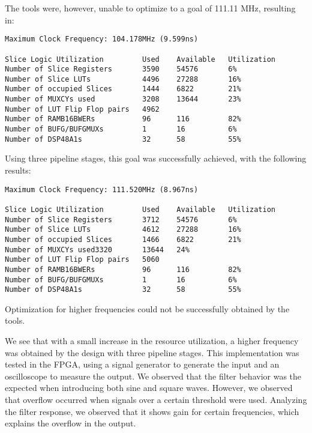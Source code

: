 \documentclass[12pt]{article}
\begin{document}
The tools were, however, unable to optimize to a goal of 111.11 MHz, resulting in:
 
\begin{verbatim}
Maximum Clock Frequency: 104.178MHz (9.599ns)

Slice Logic Utilization         Used    Available   Utilization
Number of Slice Registers       3590    54576       6% 
Number of Slice LUTs            4496    27288       16% 
Number of occupied Slices       1444    6822        21%
Number of MUXCYs used           3208    13644       23%
Number of LUT Flip Flop pairs   4962
Number of RAMB16BWERs           96      116         82%
Number of BUFG/BUFGMUXs         1       16          6% 
Number of DSP48A1s              32      58          55%
\end{verbatim}

Using three pipeline stages, this goal was successfully achieved, with the following results:

\begin{verbatim}
Maximum Clock Frequency: 111.520MHz (8.967ns)

Slice Logic Utilization         Used    Available   Utilization
Number of Slice Registers       3712    54576       6%
Number of Slice LUTs            4612    27288       16%
Number of occupied Slices       1466    6822        21%
Number of MUXCYs used3320       13644   24%
Number of LUT Flip Flop pairs   5060
Number of RAMB16BWERs           96      116         82% 
Number of BUFG/BUFGMUXs         1       16          6% 
Number of DSP48A1s              32      58          55%
\end{verbatim}

Optimization for higher frequencies could not be successfully obtained by the tools.

We see that with a small increase in the resource utilization, a higher frequency was obtained by
the design with three pipeline stages. This implementation was tested in the FPGA, using a signal
generator to generate the input and an oscilloscope to measure the output. We observed that the
filter behavior was the expected when introducing both sine and square waves. However, we observed
that overflow occurred when signals over a certain threshold were used. Analyzing the filter
response, we observed that it shows gain for certain frequencies, which explains the overflow in the
output.

 
\end{document}
